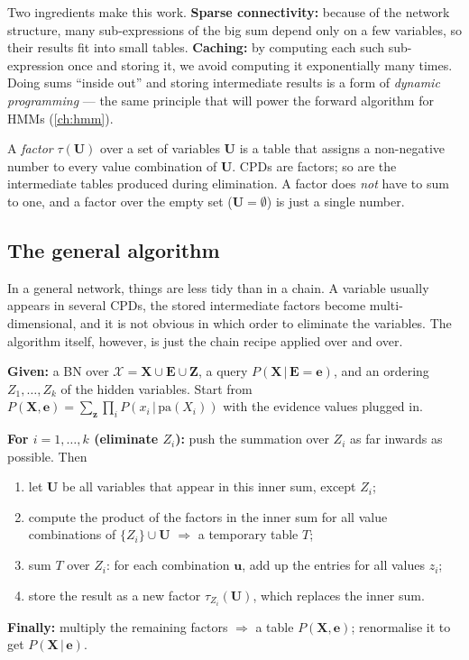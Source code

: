 \documentclass[11pt, oneside]{book}
\newcommand{\Prob}{\mathbb{P}}           %
\newcommand{\given}{\,\vert\,}           %
\newcommand{\pa}{\mathrm{pa}}            %
\newcommand{\Xall}{\mathcal{X}}          %
\newcommand{\bX}{\mathbf{X}}  \newcommand{\bY}{\mathbf{Y}}
\newcommand{\bZ}{\mathbf{Z}}  \newcommand{\bE}{\mathbf{E}}
\newcommand{\bz}{\mathbf{z}}  \newcommand{\be}{\mathbf{e}}
\let\originalsubsection\subsection
\renewcommand{\subsection}{\Needspace{6\baselineskip}\originalsubsection}
\begin{document}
Two ingredients make this work. \textbf{Sparse connectivity:} because of the
network structure, many sub-expressions of the big sum depend only on a few
variables, so their results fit into small tables. \textbf{Caching:} by
computing each such sub-expression once and storing it, we avoid computing it
exponentially many times. Doing sums ``inside out'' and storing intermediate
results is a form of \emph{dynamic programming} --- the same principle that
will power the forward algorithm for HMMs (\cref{ch:hmm}).

\begin{defbox}[title={Factor}]
A \emph{factor} $\tau(\mathbf{U})$ over a set of variables $\mathbf{U}$ is a
table that assigns a non-negative number to every value combination of
$\mathbf{U}$. CPDs are factors; so are the intermediate tables produced during
elimination. A factor does \emph{not} have to sum to one, and a factor over the
empty set ($\mathbf{U} = \emptyset$) is just a single number.
\end{defbox}

\subsection{The general algorithm}

In a general network, things are less tidy than in a chain. A variable
usually appears in several CPDs, the stored intermediate factors become
multi-dimensional, and it is not obvious in which order to eliminate the
variables. The algorithm itself, however, is just the chain recipe applied
over and over.

\begin{thmbox}[title={Variable elimination (VE) for Bayesian networks}]
\textbf{Given:} a BN over $\Xall = \bX \cup \bE \cup \bZ$, a query
$P(\bX \given \bE = \be)$, and an ordering $Z_1, \ldots, Z_k$ of the hidden
variables. Start from $P(\bX, \be) = \sum_{\bz} \prod_i P(x_i \given
\pa(X_i))$ with the evidence values plugged in.\par
\textbf{For $i = 1, \ldots, k$ (eliminate $Z_i$):} push the summation over
$Z_i$ as far inwards as possible. Then
\begin{enumerate}
  \item let $\mathbf{U}$ be all variables that appear in this inner sum, except
    $Z_i$;
  \item compute the product of the factors in the inner sum for all value
    combinations of $\{Z_i\} \cup \mathbf{U}$ $\Rightarrow$ a temporary table $T$;
  \item sum $T$ over $Z_i$: for each combination $\mathbf{u}$, add up the
    entries for all values $z_i$;
  \item store the result as a new factor $\tau_{Z_i}(\mathbf{U})$, which
    replaces the inner sum.
\end{enumerate}
\textbf{Finally:} multiply the remaining factors $\Rightarrow$ a table
$P(\bX, \be)$; renormalise it to get $P(\bX \given \be)$.
\end{thmbox}
\end{document}
